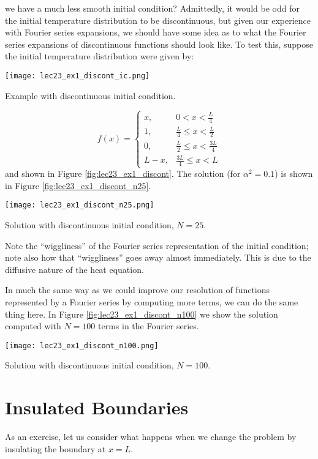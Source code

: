  we have a much less smooth initial condition?  Admittedly, it would be odd for the initial temperature distribution to be discontinuous, but given our experience with Fourier series expansions, we should have some idea as to what the Fourier series expansions of discontinuous functions should look like.  To test this, suppose the initial temperature distribution were given by:
\begin{marginfigure}
\texttt{[image: lec23\_ex1\_discont\_ic.png]}
\caption{Example with discontinuous initial condition.}
\label{fig:lec23_ex1_discont}
\end{marginfigure}
\begin{equation*}
f(x) = 
\begin{cases}
x, & 0 < x < \frac{L}{4} \\
1, & \frac{L}{4} \le x < \frac{L}{2} \\
0, & \frac{L}{2} \le x < \frac{3L}{4} \\
L-x, & \frac{3L}{4} \le x < L

\end{cases}
\end{equation*}
and shown in Figure \ref{fig:lec23_ex1_discont}. The solution (for $\alpha^2=0.1$) is shown in Figure \ref{fig:lec23_ex1_discont_n25}. 
\begin{marginfigure} 
\texttt{[image: lec23\_ex1\_discont\_n25.png]}
\caption{Solution with discontinuous initial condition, $N=25$.}
\label{fig:lec23_ex1_discont_n25}
\end{marginfigure} 
Note the ``wiggliness'' of the Fourier series representation of the initial condition; note also how that ``wiggliness'' goes away almost immediately. This is due to the diffusive nature of the heat equation.

In much the same way as we could improve our resolution of functions represented by a Fourier series by computing more terms, we can do the same thing here.  In Figure \ref{fig:lec23_ex1_discont_n100} we show the solution computed with $N=100$ terms in the Fourier series.
\begin{marginfigure}
\texttt{[image: lec23\_ex1\_discont\_n100.png]}
\caption{Solution with discontinuous initial condition, $N=100$.}
\label{fig:lec23_ex1_discont_n100}
\end{marginfigure}

\section{Insulated Boundaries}
As an exercise, let us consider what happens when we change the problem by insulating the boundary at $x=L$.  

